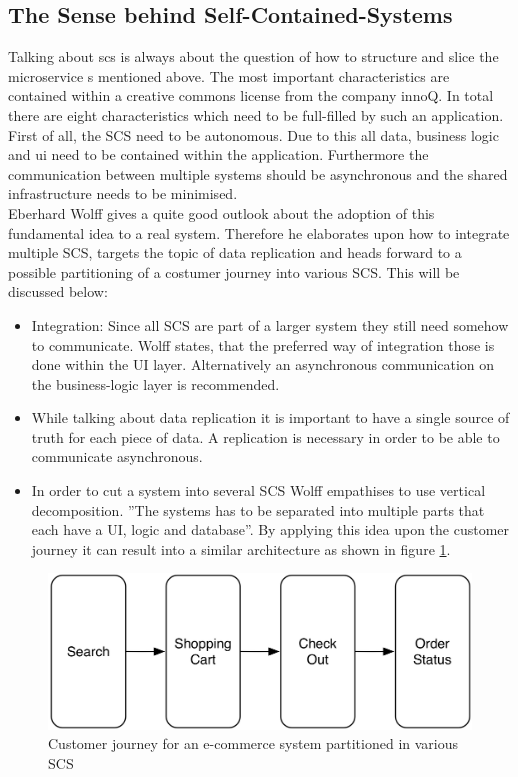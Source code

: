 \subsection{The Sense behind Self-Contained-Systems}
Talking about \acrfull{scs} is always about the question of how to structure and slice the microservice s mentioned above.\newline
The most important characteristics are contained within a creative commons license from the company innoQ. In total there are eight characteristics which need to be full-filled by such an application. First of all, the SCS need to be autonomous. Due to this all data, business logic and \acrshort{ui} need to be contained within the application. Furthermore the communication between multiple systems should be asynchronous and the shared infrastructure needs to be minimised. \cite{scs}\newline
\\
Eberhard Wolff gives a quite good outlook about the adoption of this fundamental idea to a real system. Therefore he elaborates upon how to integrate multiple SCS, targets the topic of data replication and heads forward to a possible partitioning of a costumer journey into various SCS. This will be discussed below:\newline
\begin{itemize}
    \item Integration: Since all SCS are part of a larger system they still need somehow to communicate. Wolff states, that the preferred way of integration those is done within the UI layer. Alternatively an asynchronous communication on the business-logic layer is recommended.
    \item While talking about data replication it is important to have a single source of truth for each piece of data. A replication is necessary in order to be able to communicate asynchronous.
    \item In order to cut a system into several SCS Wolff empathises to use vertical decomposition. ''The systems has to be separated into multiple parts that each have a UI, logic and database''\cite{scsWolf}. By applying this idea upon the customer journey it can result into a similar architecture as shown in figure \ref{fig:scsJourney}.
\end{itemize}
\cite{scsWolf}\newline
\begin{figure}[!htb]
    \centering
    \includegraphics[scale=0.2]{pictures/Journey.png}
    \caption{Customer journey for an e-commerce system partitioned in various SCS \cite{scsWolf}}
    \label{fig:scsJourney}
\end{figure}

